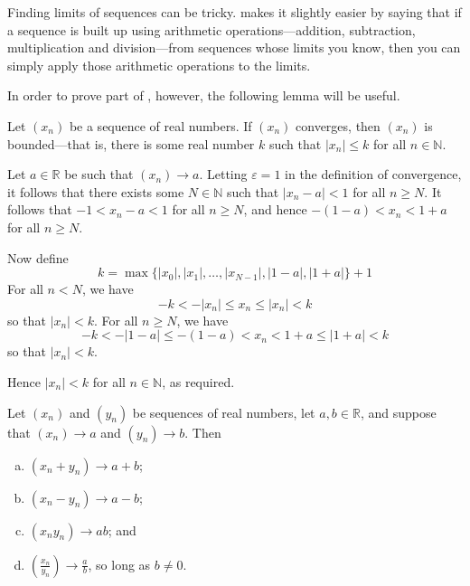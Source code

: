 Finding limits of sequences can be tricky.  makes it slightly easier by saying that if a sequence is built up using arithmetic operations---addition, subtraction, multiplication and division---from sequences whose limits you know, then you can simply apply those arithmetic operations to the limits.

In order to prove part of , however, the following lemma will be useful.

\begin{lemma}
\label{lemConvergentSequencesAreBounded}
Let $(x_n)$ be a sequence of real numbers. If $(x_n)$ converges, then $(x_n)$ is bounded---that is, there is some real number $k$ such that $|x_n| \le k$ for all $n \in \mathbb{N}$.
\end{lemma}

\begin{cproof}
Let $a \in \mathbb{R}$ be such that $(x_n) \to a$. Letting $\varepsilon = 1$ in the definition of convergence, it follows that there exists some $N \in \mathbb{N}$ such that $|x_n-a| < 1$ for all $n \ge N$. It follows that $-1 < x_n-a < 1$ for all $n \ge N$, and hence $-(1-a) < x_n < 1+a$ for all $n \ge N$.

Now define
\[ k = \max \{ |x_0|, |x_1|, \dots, |x_{N-1}|, |1-a|, |1+a| \} + 1 \]
For all $n < N$, we have
\[ -k < -|x_n| \le x_n \le |x_n| < k \]
so that $|x_n| < k$. For all $n \ge N$, we have
\[ -k < -|1-a| \le -(1-a) < x_n < 1+a \le |1+a| < k \]
so that $|x_n| < k$.

Hence $|x_n| < k$ for all $n \in \mathbb{N}$, as required.
\end{cproof}

\begin{theorem}
\label{thmLimitsPreserveArithmeticOperations}
Let $(x_n)$ and $(y_n)$ be sequences of real numbers, let $a,b \in \mathbb{R}$, and suppose that $(x_n) \to a$ and $(y_n) \to b$. Then
\begin{enumerate}[(a)]
\item $(x_n+y_n) \to a+b$;
\item $(x_n-y_n) \to a-b$;
\item $(x_ny_n) \to ab$; and
\item $(\frac{x_n}{y_n}) \to \frac{a}{b}$, so long as $b \ne 0$.
\end{enumerate}
\end{theorem}

